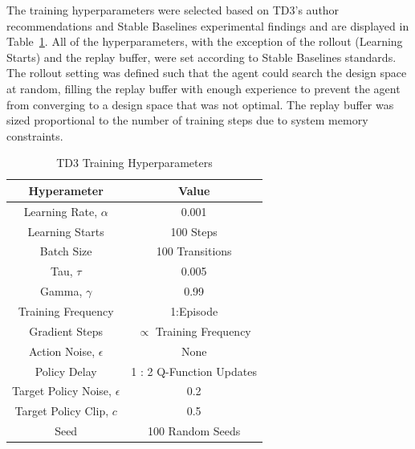 \documentclass[letterpaper, 10 pt, conference]{ieeeconf}  %
\begin{document}
The training hyperparameters were selected based on TD3's author recommendations and Stable Baselines experimental findings and are displayed in Table~\ref{tab:training_hyperameters}. All of the hyperparameters, with the exception of the rollout (Learning Starts) and the replay buffer, were set according to Stable Baselines standards. The rollout setting was defined such that the agent could search the design space at random, filling the replay buffer with enough experience to prevent the agent from converging to a design space that was not optimal. The replay buffer was sized proportional to the number of training steps due to system memory constraints.  
%
\begin{table}[t]
        \caption{TD3 Training Hyperparameters}
        \vspace{-4mm}
        \label{tab:training_hyperameters}
        \begin{center}
        \begin{tabular}{|c||c|}
        \hline
        Hyperameter                     & Value                           \\
        \hline
        Learning Rate, $\alpha$         & 0.001                           \\
        Learning Starts                 & 100 Steps                       \\
        Batch Size                      & 100 Transitions                 \\
        Tau, $\tau$                     & 0.005                           \\
        Gamma, $\gamma$                 & 0.99                            \\
        Training Frequency              & 1:Episode                       \\
        Gradient Steps                  & $\propto$ Training Frequency    \\
        Action Noise,  $\epsilon$       & None                            \\
        Policy Delay                    & 1 : 2 Q-Function Updates        \\
        Target Policy Noise, $\epsilon$ & 0.2                             \\
        Target Policy Clip, $c$         & 0.5                             \\
        Seed                            & 100 Random Seeds                \\
        \hline
        \end{tabular}
        \end{center}
        \vspace{-5mm}
\end{table}
%
\end{document}
